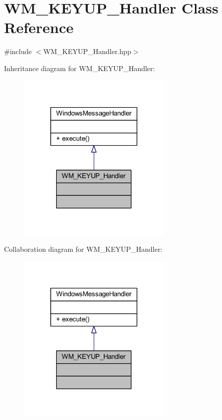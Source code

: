 \hypertarget{class_w_m___k_e_y_u_p___handler}{}\section{W\+M\+\_\+\+K\+E\+Y\+U\+P\+\_\+\+Handler Class Reference}
\label{class_w_m___k_e_y_u_p___handler}


{\ttfamily \#include $<$W\+M\+\_\+\+K\+E\+Y\+U\+P\+\_\+\+Handler.\+hpp$>$}



Inheritance diagram for W\+M\+\_\+\+K\+E\+Y\+U\+P\+\_\+\+Handler\+:\nopagebreak
\begin{figure}[H]
\begin{center}
\leavevmode
\includegraphics[width=209pt]{class_w_m___k_e_y_u_p___handler__inherit__graph}
\end{center}
\end{figure}


Collaboration diagram for W\+M\+\_\+\+K\+E\+Y\+U\+P\+\_\+\+Handler\+:\nopagebreak
\begin{figure}[H]
\begin{center}
\leavevmode
\includegraphics[width=209pt]{class_w_m___k_e_y_u_p___handler__coll__graph}
\end{center}
\end{figure}
